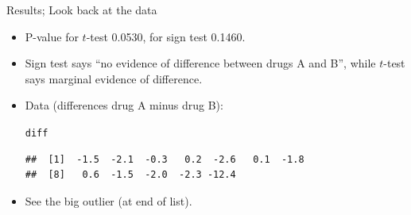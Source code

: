 \documentclass[unknownkeysallowed]{beamer}\usepackage[]{graphicx}\usepackage[]{color}
\makeatletter
\newcommand{\hlstd}[1]{\textcolor[rgb]{0.345,0.345,0.345}{#1}}%
\newenvironment{kframe}{%
 \def\at@end@of@kframe{}%
 \ifinner\ifhmode%
  \def\at@end@of@kframe{\end{minipage}}%
  \begin{minipage}{\columnwidth}%
 \fi\fi%
 \def\FrameCommand##1{\hskip\@totalleftmargin \hskip-\fboxsep
 \colorbox{shadecolor}{##1}\hskip-\fboxsep
     \hskip-\linewidth \hskip-\@totalleftmargin \hskip\columnwidth}%
 \MakeFramed {\advance\hsize-\width
   \@totalleftmargin\z@ \linewidth\hsize
   \@setminipage}}%
 {\par\unskip\endMakeFramed%
 \at@end@of@kframe}
\newenvironment{knitrout}{}{} %
\makeatother
\begin{document}
\begin{frame}[fragile]{Results; Look back at the data}
  
  \begin{itemize}
    \item P-value for $t$-test 0.0530, for sign test 0.1460.
    \item Sign test says ``no evidence of difference between drugs A
      and B'', while $t$-test says marginal evidence of difference.
  \item Data (differences drug A minus drug B):


    
\begin{knitrout}
\color{fgcolor}\begin{kframe}
\begin{alltt}
\hlstd{diff}
\end{alltt}
\begin{verbatim}
##  [1]  -1.5  -2.1  -0.3   0.2  -2.6   0.1  -1.8
##  [8]   0.6  -1.5  -2.0  -2.3 -12.4
\end{verbatim}
\end{kframe}
\end{knitrout}
\item See the big outlier (at end of list).

  \end{itemize}
  
\end{frame}
\end{document}
